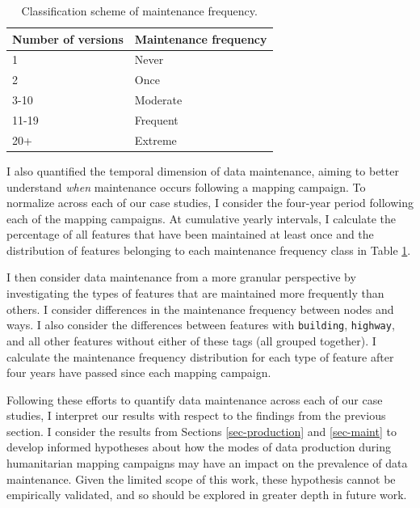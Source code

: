 \begin{table}[]
\centering
\caption{Classification scheme of maintenance frequency.}
\label{tab:freq}
\begin{tabular}{ll}
\toprule
Number of versions & Maintenance frequency \\
\midrule
1                  & Never                  \\
2                  & Once                  \\
3-10               & Moderate              \\
11-19              & Frequent              \\
20+                & Extreme               \\
\bottomrule
\end{tabular}
\end{table}

I also quantified the temporal dimension of data maintenance, aiming to better understand \textit{when} maintenance occurs following a mapping campaign. To normalize across each of our case studies, I consider the four-year period following each of the mapping campaigns. At cumulative yearly intervals, I calculate the percentage of all features that have been maintained at least once and the distribution of features belonging to each maintenance frequency class in Table \ref{tab:freq}. 

I then consider data maintenance from a more granular perspective by investigating the types of features that are maintained more frequently than others. I consider differences in the maintenance frequency between nodes and ways. I also consider the differences between features with \texttt{building}, \texttt{highway}, and all other features without either of these tags (all grouped together). I calculate the maintenance frequency distribution for each type of feature after four years have passed since each mapping campaign. 

Following these efforts to quantify data maintenance across each of our case studies, I interpret our results with respect to the findings from the previous section. I consider the results from Sections \ref{sec-production} and \ref{sec-maint} to develop informed hypotheses about how the modes of data production during humanitarian mapping campaigns may have an impact on the prevalence of data maintenance. Given the limited scope of this work, these hypothesis cannot be empirically validated, and so should be explored in greater depth in future work. 

